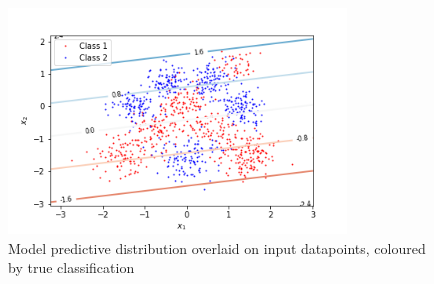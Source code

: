 \documentclass[a4paper]{article}
\begin{document}
    \begin{figure}[h]
        \label{fig:predictive_distribution_linear}
        \centering
        \includegraphics[width=0.8\textwidth]{plots/predictive_distribution_linear.png}
        \caption{Model predictive distribution overlaid on input datapoints, coloured by true classification}
    \end{figure}
\end{document}
